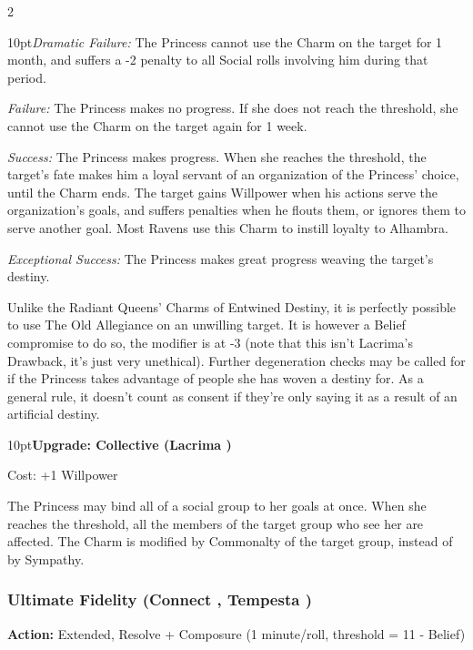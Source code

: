 \begin{multicols}{2}
\begin{myindentpar}{10pt}\emph{Dramatic Failure:} The Princess cannot use the Charm on the target for 1 month, and suffers a -2 penalty to all Social rolls involving him during that period.

\emph{Failure:} The Princess makes no progress. If she does not reach the threshold, she cannot use the Charm on the target again for 1 week.

\emph{Success:} The Princess makes progress. When she reaches the threshold, the target's fate makes him a loyal servant of an organization of the Princess' choice, until the Charm ends. The target gains Willpower when his actions serve the organization's goals, and suffers penalties when he flouts them, or ignores them to serve another goal. Most Ravens use this Charm to instill loyalty to Alhambra. 

\emph{Exceptional Success:} The Princess makes great progress weaving the target's destiny.\end{myindentpar}

\noindent Unlike the Radiant Queens' Charms of Entwined Destiny, it is perfectly possible to use The Old Allegiance on an unwilling target. It is however a Belief compromise to do so, the modifier is at -3 (note that this isn't Lacrima's Drawback, it's just very unethical). Further degeneration checks may be called for if the Princess takes advantage of people she has woven a destiny for. As a general rule, it doesn't count as consent if they're only saying it as a result of an artificial destiny.

\begin{myindentpar}{10pt}\textbf{Upgrade: Collective (Lacrima \textbullet\textbullet\textbullet\textbullet)}

Cost: +1 Willpower

The Princess may bind all of a social group to her goals at once. When she reaches the threshold, all the members of the target group who see her are affected. The Charm is modified by Commonalty of the target group, instead of by Sympathy.\end{myindentpar}

\subsubsection*{Ultimate Fidelity (Connect \textbullet\textbullet\textbullet\textbullet, Tempesta \textbullet\textbullet\textbullet)}

\noindent \textbf{Action:} Extended, Resolve + Composure (1 minute/roll, threshold = 11 - Belief)


\end{multicols}
